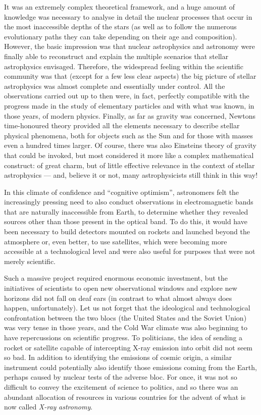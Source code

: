 It was an extremely complex theoretical framework, and a huge amount of knowledge was
necessary to analyse in detail the nuclear processes that occur in the most inaccessible
depths of the stars (as well as to follow the numerous evolutionary paths they can take
depending on their age and composition). However, the basic impression was that nuclear
astrophysics and astronomy were finally able to reconstruct and explain the multiple
scenarios that stellar astrophysics envisaged. Therefore, the widespread feeling within
the scientific community was that (except for a few less clear aspects) the big picture
of stellar astrophysics was almost complete and essentially under control. All the
observations carried out up to then were, in fact, perfectly compatible with the
progress made in the study of elementary particles and with what was known, in those
years, of modern physics. Finally, as far as gravity was concerned,
Newton\textquotesingle s time-honoured theory provided all the elements necessary to
describe stellar physical phenomena, both for objects such as the Sun and for those with
masses even a hundred times larger. Of course, there was also Einstein\textquotesingle s
theory of gravity that could be invoked, but most considered it more like a complex
mathematical construct: of great charm, but of little effective relevance in the context
of stellar astrophysics --- and, believe it or not, many astrophysicists still think in
this way!

In this climate of confidence and ``cognitive optimism'', astronomers felt the
increasingly pressing need to also conduct observations in electromagnetic bands that
are naturally inaccessible from Earth, to determine whether they revealed sources other
than those present in the optical band. To do this, it would have been necessary to
build detectors mounted on rockets and launched beyond the atmosphere or, even better,
to use satellites, which were becoming more accessible at a technological level and were
also useful for purposes that were not merely scientific.

Such a massive project required enormous economic investment, but the initiatives of
scientists to open new observational windows and explore new horizons
did not fall on deaf ears (in contrast to what almost always does happen,
unfortunately). Let us not forget that the ideological and technological confrontation
between the two blocs (the United States and the Soviet Union) was very tense in those
years, and the Cold War climate was also beginning to have repercussions on scientific
progress. To politicians, the idea of sending a rocket or satellite capable of
intercepting X-ray emission into orbit did not seem so bad. In
addition to identifying the emissions of cosmic origin, a similar instrument could
potentially also identify those emissions coming from the Earth, perhaps caused by
nuclear tests of the adverse bloc. For once, it was not so difficult to convey the
excitement of science to politics, and so there was an abundant allocation of resources
in various countries for the advent of what is now called
\emph{X-ray} \emph{astronomy}.

